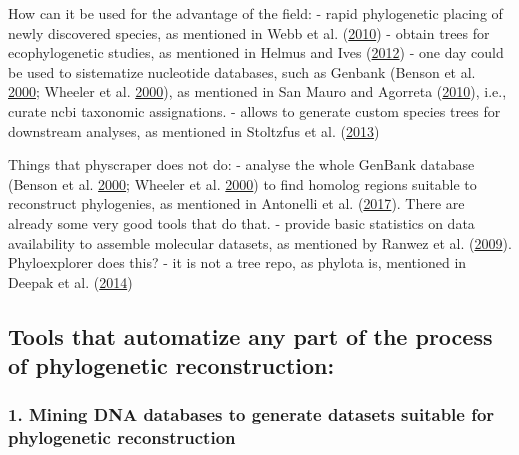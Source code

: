 \documentclass[]{article}
\begin{document}
How can it be used for the advantage of the field:
- rapid phylogenetic placing of newly discovered species, as mentioned in Webb et al. (\protect\hyperlink{ref-webb2010biodiversity}{2010})
- obtain trees for ecophylogenetic studies, as mentioned in Helmus and Ives (\protect\hyperlink{ref-helmus2012phylogenetic}{2012})
- one day could be used to sistematize nucleotide databases, such as Genbank (Benson et al. \protect\hyperlink{ref-benson2000genbank}{2000}; Wheeler et al. \protect\hyperlink{ref-wheeler2000database}{2000}), as mentioned in San Mauro and Agorreta (\protect\hyperlink{ref-san2010molecular}{2010}), i.e., curate ncbi taxonomic assignations.
- allows to generate custom species trees for downstream analyses, as mentioned in Stoltzfus et al. (\protect\hyperlink{ref-stoltzfus2013phylotastic}{2013})

Things that physcraper does not do:
- analyse the whole GenBank database (Benson et al. \protect\hyperlink{ref-benson2000genbank}{2000}; Wheeler et al. \protect\hyperlink{ref-wheeler2000database}{2000}) to find homolog regions suitable to reconstruct phylogenies, as mentioned in Antonelli et al. (\protect\hyperlink{ref-antonelli2017toward}{2017}). There are already some very good tools that do that.
- provide basic statistics on data availability to assemble molecular datasets, as mentioned by Ranwez et al. (\protect\hyperlink{ref-ranwez2009phyloexplorer}{2009}). Phyloexplorer does this?
- it is not a tree repo, as phylota is, mentioned in Deepak et al. (\protect\hyperlink{ref-deepak2014evominer}{2014})

\hypertarget{tools-that-automatize-any-part-of-the-process-of-phylogenetic-reconstruction}{%
\subsection{Tools that automatize any part of the process of phylogenetic reconstruction:}\label{tools-that-automatize-any-part-of-the-process-of-phylogenetic-reconstruction}}

\hypertarget{mining-dna-databases-to-generate-datasets-suitable-for-phylogenetic-reconstruction}{%
\subsubsection{1. Mining DNA databases to generate datasets suitable for phylogenetic reconstruction}\label{mining-dna-databases-to-generate-datasets-suitable-for-phylogenetic-reconstruction}}
\end{document}
